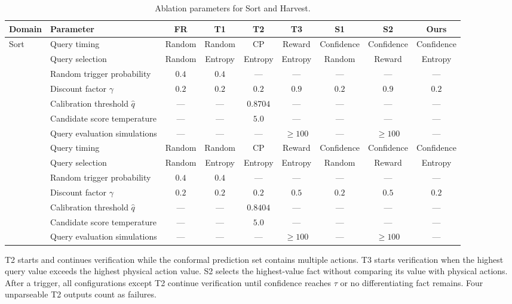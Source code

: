 \begin{table}[!htbp]
\centering
\caption{Ablation parameters for Sort and Harvest.}
\label{tab:app_ablation_params}
\footnotesize
\setlength{\tabcolsep}{2pt}
\renewcommand{\arraystretch}{1.05}
\setlength{\extrarowheight}{0pt}
\begin{tabular*}{\textwidth}{@{\extracolsep{\fill}}llccccccc@{}}
\toprule
Domain & Parameter & FR & T1 & T2 & T3 & S1 & S2 & \textbf{Ours} \\
\midrule
\multirow{7}{*}{Sort} & Query timing & Random & Random & CP & Reward & Confidence & Confidence & Confidence \\
 & Query selection & Random & Entropy & Entropy & Entropy & Random & Reward & Entropy \\
 & Random trigger probability & $0.4$ & $0.4$ & --- & --- & --- & --- & --- \\
 & Discount factor $\gamma$ & $0.2$ & $0.2$ & $0.2$ & $0.9$ & $0.2$ & $0.9$ & $0.2$ \\
 & Calibration threshold $\hat{q}$ & --- & --- & $0.8704$ & --- & --- & --- & --- \\
 & Candidate score temperature & --- & --- & $5.0$ & --- & --- & --- & --- \\
 & Query evaluation simulations & --- & --- & --- & $\geq 100$ & --- & $\geq 100$ & --- \\
\addlinespace[3pt]
\multirow{7}{*}{Harvest} & Query timing & Random & Random & CP & Reward & Confidence & Confidence & Confidence \\
 & Query selection & Random & Entropy & Entropy & Entropy & Random & Reward & Entropy \\
 & Random trigger probability & $0.4$ & $0.4$ & --- & --- & --- & --- & --- \\
 & Discount factor $\gamma$ & $0.2$ & $0.2$ & $0.2$ & $0.5$ & $0.2$ & $0.5$ & $0.2$ \\
 & Calibration threshold $\hat{q}$ & --- & --- & $0.8404$ & --- & --- & --- & --- \\
 & Candidate score temperature & --- & --- & $5.0$ & --- & --- & --- & --- \\
 & Query evaluation simulations & --- & --- & --- & $\geq 100$ & --- & $\geq 100$ & --- \\
\bottomrule
\end{tabular*}
\end{table}

T2 starts and continues verification while the conformal prediction set contains multiple actions. T3 starts verification when the highest query value exceeds the highest physical action value. S2 selects the highest-value fact without comparing its value with physical actions. After a trigger, all configurations except T2 continue verification until confidence reaches $\tau$ or no differentiating fact remains. Four unparseable T2 outputs count as failures.


